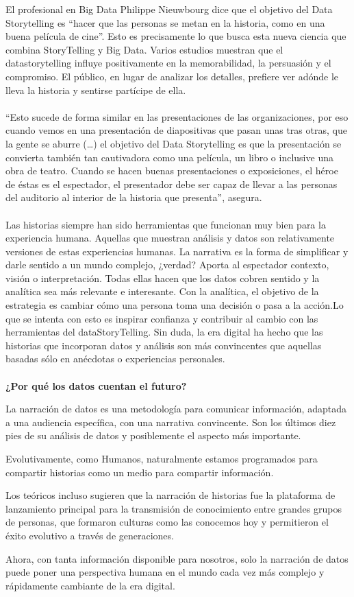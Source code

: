 \documentclass[a4paper,12pt,twocolumn]{article}
\begin{document}
\item{El profesional en Big Data Philippe Nieuwbourg dice que el objetivo del Data Storytelling es “hacer que las personas se metan en la historia, como en una buena película de cine”. Esto es precisamente lo que busca esta nueva ciencia que combina StoryTelling y Big Data. Varios estudios muestran que el datastorytelling influye positivamente en la memorabilidad, la persuasión y el compromiso. El público, en lugar de analizar los detalles, prefiere ver adónde le lleva la historia y sentirse partícipe de ella.
\\\\“Esto sucede de forma similar en las presentaciones de las organizaciones, por eso cuando vemos en una presentación de diapositivas que pasan unas tras otras, que la gente se aburre (…) el objetivo del Data Storytelling es que la presentación se convierta también tan cautivadora como una película, un libro o inclusive una obra de teatro. Cuando se hacen buenas presentaciones o exposiciones, el héroe de éstas es el espectador, el presentador debe ser capaz de llevar a las personas del auditorio al interior de la historia que presenta”, asegura.
\\\\Las historias siempre han sido herramientas que funcionan muy bien para la experiencia humana. Aquellas que muestran análisis y datos son relativamente versiones de estas experiencias humanas. La narrativa es la forma de simplificar y darle sentido a un mundo complejo, ¿verdad? Aporta al espectador contexto, visión o interpretación. Todas ellas hacen que los datos cobren sentido y la analítica sea más relevante e interesante. Con la analítica, el objetivo de la estrategia es cambiar cómo una persona toma una decisión o pasa a la acción.Lo que se intenta con esto es inspirar confianza y contribuir al cambio con las herramientas del dataStoryTelling. Sin duda, la era digital ha hecho que las historias que incorporan datos y análisis son más convincentes que aquellas basadas sólo en anécdotas o experiencias personales.}
\textbf{}\\
\textbf{}\\
\textbf {¿Por qué los datos cuentan el futuro?}\\

\item{La narración de datos es una metodología para comunicar información, adaptada a una audiencia específica, con una narrativa convincente. Son los últimos diez pies de su análisis de datos y posiblemente el aspecto más importante.

Evolutivamente, como Humanos, naturalmente estamos programados para compartir historias como un medio para compartir información.

Los teóricos incluso sugieren que la narración de historias fue la plataforma de lanzamiento principal para la transmisión de conocimiento entre grandes grupos de personas, que formaron culturas como las conocemos hoy y permitieron el éxito evolutivo a través de generaciones.

Ahora, con tanta información disponible para nosotros, solo la narración de datos puede poner una perspectiva humana en el mundo cada vez más complejo y rápidamente cambiante de la era digital.}
\end{document}
